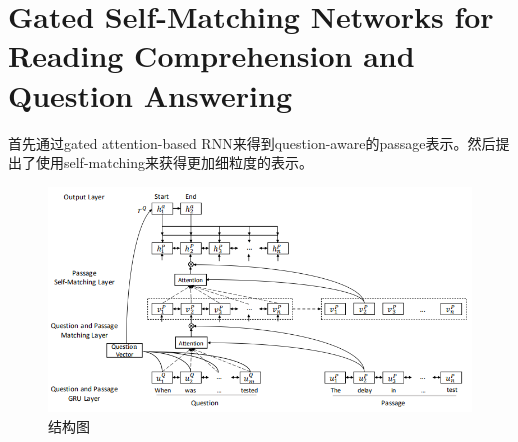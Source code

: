 \documentclass[a4paper,UTF8]{article}
\numberwithin{equation}{section}
\begin{document}
\section{Gated Self-Matching Networks for Reading Comprehension and Question Answering}
首先通过gated attention-based RNN来得到question-aware的passage表示。然后提出了使用self-matching来获得更加细粒度的表示。
\begin{figure}[H]
	\centering
	\includegraphics[width=\textwidth]{4-1.png}
	\caption{结构图}
\end{figure}
\end{document}
